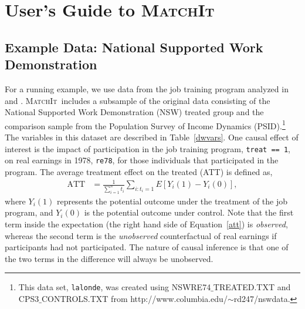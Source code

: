 \documentclass[oneside,letterpaper,titlepage]{article}
\newcommand{\MatchIt}{\textsc{MatchIt}}
\begin{document}
\section{User's Guide to \MatchIt}
\label{methods}


\subsection{Example Data: National Supported Work Demonstration}
\label{subsec:lalonde}

For a running example, we use data from the job training program
analyzed in \citet{lalonde86} and \citet{DehWah99}. \MatchIt\ includes
a subsample of the original data consisting of the National Supported
Work Demonstration (NSW) treated group and the comparison sample from
the Population Survey of Income Dynamics (PSID).\footnote{This data
set, \texttt{lalonde}, was created using NSWRE74$\_$TREATED.TXT and
CPS3$\_$CONTROLS.TXT from
http://www.columbia.edu/$\sim$rd247/nswdata.}  The variables in this
dataset are described in Table~\ref{dwvars}.  One causal effect of
interest is the impact of participation in the job training program,
\texttt{treat == 1}, on real earnings in 1978, \texttt{re78}, for
those individuals that participated in the program.  The average
treatment effect on the treated (ATT) is defined as,
\begin{align}
  \label{att}
  \text{ATT} & = \frac{1}{\sum_{i=1}^n t_i}\sum_{i:t_i=1} E[Y_i(1) - Y_i(0)],
\end{align}
where $Y_i(1)$ represents the potential outcome under the treatment of
the job program, and $Y_i(0)$ is the potential outcome under control.
Note that the first term inside the expectation (the right hand side
of Equation~\ref{att}) is \emph{observed}, whereas the second term is
the \emph{unobserved} counterfactual of real earnings if participants
had not participated.  The nature of causal inference is that one of
the two terms in the difference will always be unobserved.
\end{document}
